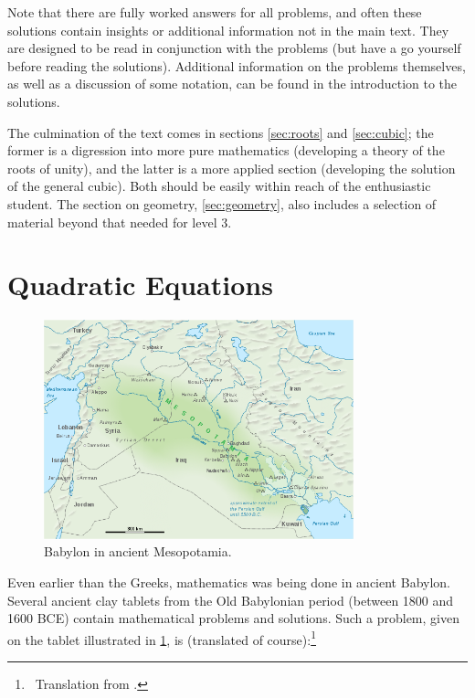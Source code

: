 \documentclass[a4paper,10pt,titlepage]{article}
\theoremstyle{definition}
\begin{document}
Note that there are fully worked answers for all problems, and often these solutions
contain insights or additional information not in the main text. They are designed to
be read in conjunction with the problems (but have a go yourself before reading the
solutions). Additional information on the problems themselves, as well as a discussion
of some notation, can be found in the introduction to the solutions.

The culmination of the text comes in sections \ref{sec:roots} and \ref{sec:cubic}; the former is a digression
into more pure mathematics (developing a theory of the roots of unity), and the latter
is a more applied section (developing the solution of the general cubic). Both should
be easily within reach of the enthusiastic student. The section on geometry, \ref{sec:geometry}, also includes
a selection of material beyond that needed for level 3.

\section{Quadratic Equations}\label{sec:quadratic}
\begin{figure}
  \centering
  \includegraphics[width=0.8\textwidth]{meso}
  \caption[blag]{Babylon in ancient Mesopotamia.\footnotemark\label{fig:babylon2}}
\end{figure}

Even earlier than the Greeks, mathematics was being done in ancient Babylon.
Several ancient clay tablets from the Old Babylonian period (between 1800 and 1600 BCE)
contain mathematical problems and solutions. Such a problem, given on the tablet
illustrated in \cref{fig:babylon2}, is (translated of course):\footnote{~Translation from \cite{Ste08}.}
\end{document}
